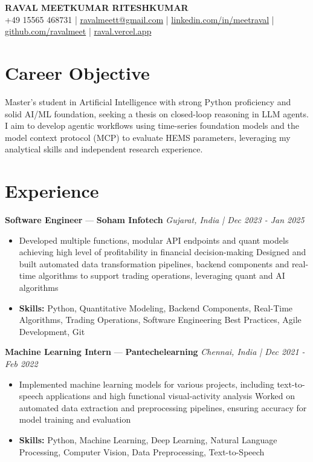 \documentclass[a4paper,10pt]{article}
\begin{document}
\begin{center}
  {\Large\bfseries RAVAL MEETKUMAR RITESHKUMAR}\\[2pt]
  {\small +49 15565 468731 \;|\; \href{mailto:ravalmeett@gmail.com}{ravalmeett@gmail.com} \;|\; \href{https://www.linkedin.com/in/meetraval/}{linkedin.com/in/meetraval} \;|\; \href{https://github.com/ravalmeet}{github.com/ravalmeet} \;|\; \href{https://raval.vercel.app/}{raval.vercel.app}}
\end{center}
\vspace{-3pt}

\section*{Career Objective}
Master's student in Artificial Intelligence with strong Python proficiency and solid AI/ML foundation, seeking a thesis on closed-loop reasoning in LLM agents. I aim to develop agentic workflows using time-series foundation models and the model context protocol (MCP) to evaluate HEMS parameters, leveraging my analytical skills and independent research experience.\par

\section*{Experience}
\textbf{Software Engineer} — \textbf{Soham Infotech} \hfill \textit{Gujarat, India \;|\; Dec 2023 - Jan 2025}\par
\vspace{1pt}
\begin{itemize}
  \item Developed multiple functions, modular API endpoints and quant models achieving high level of profitability in financial decision-making Designed and built automated data transformation pipelines, backend components and real-time algorithms to support trading operations, leveraging quant and AI algorithms
  \item \textbf{Skills:} Python, Quantitative Modeling, Backend Components, Real-Time Algorithms, Trading Operations, Software Engineering Best Practices, Agile Development, Git
\end{itemize}
\vspace{3pt}
\textbf{Machine Learning Intern} — \textbf{Pantechelearning} \hfill \textit{Chennai, India \;|\; Dec 2021 - Feb 2022}\par
\vspace{1pt}
\begin{itemize}
  \item Implemented machine learning models for various projects, including text-to-speech applications and high functional visual-activity analysis Worked on automated data extraction and preprocessing pipelines, ensuring accuracy for model training and evaluation
  \item \textbf{Skills:} Python, Machine Learning, Deep Learning, Natural Language Processing, Computer Vision, Data Preprocessing, Text-to-Speech
\end{itemize}
\end{document}
